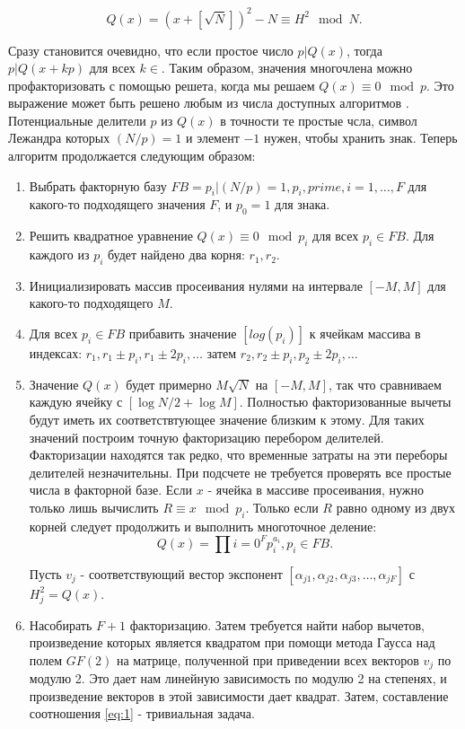 \documentclass[a4paper,12pt]{report}
\begin{document}
\begin{equation}\label{eq:2}
Q(x) = (x + [\sqrt{N}])^2 - N \equiv H^2 \mod N.
\end{equation}

Сразу становится очевидно, что если простое число $p | Q(x)$, тогда $p | Q(x + kp)$ для всех $k \in $. Таким образом, значения многочлена можно профакторизовать с помощью решета, когда мы решаем $Q(x) \equiv 0 \mod p$. Это выражение может быть решено любым из числа доступных алгоритмов \cite[стр 437]{knuth}. Потенциальные делители $p$ из $Q(x)$ в точности те простые чсла, символ Лежандра которых $(N/p) = 1$ и элемент $-1$ нужен, чтобы хранить знак. 
Теперь алгоритм продолжается следующим образом:

\begin{enumerate}[label=\roman*]
	\item Выбрать факторную базу $FB = {p_i | (N/p) = 1, p_i, prime, i = 1, \ldots, F}$ для какого-то подходящего значения $F$, и $p_0 = 1$ для знака.
	\item Решить квадратное уравнение $Q(x) \equiv 0 \mod p_i$ для всех $p_i \in FB$. Для каждого из $p_i$ будет найдено два корня: $r_1, r_2$.
	\item Инициализировать массив просеивания нулями на интервале $[-M, M]$ для какого-то подходящего $M$.
	\item Для всех $p_i \in FB$ прибавить значение $[log(p_i)]$ к ячейкам массива в индексах: $r_1, r_1 \pm p_i, r_1 \pm 2p_i, \ldots$ затем $r_2, r_2 \pm p_i, p_2 \pm 2p_i, \ldots$
	\item Значение $Q(x)$ будет примерно $M\sqrt{N}$ на $[-M, M]$, так что сравниваем каждую ячейку с  $[\log{N}/2 + \log{M}]$. Полностью факторизованные вычеты будут иметь их соответствтующее значение близким к этому. Для таких значений построим точную факторизацию перебором делителей. Факторизации находятся так редко, что временные затраты на эти переборы делителей незначительны. При подсчете не требуется проверять все простые числа в факторной базе. Если $x$ - ячейка в массиве просеивания, нужно только лишь вычислить $R \equiv x \mod p_i$. Только если $R$ равно одному из двух корней следует продолжить и выполнить многоточное деление:
\begin{equation}\label{eq:3}
Q(x) = \prod{i = 0}^{F}p_i^{a_i}, p_i \in FB.
\end{equation}

Пусть $v_j$ - соответствующий вестор экспонент $[\alpha_{j1}, \alpha_{j2}, \alpha_{j3}, \ldots, \alpha_{jF}]$ с $H_{j}^2 = Q(x)$. 
	\item Насобирать $F+1$ факторизацию. Затем требуется найти набор вычетов, произведение которых является квадратом при помощи метода Гаусса над полем $GF(2)$ на матрице, полученной при приведении всех векторов $v_j$ по модулю 2. Это дает нам линейную зависимость по модулю 2 на степенях, и произведение векторов в этой зависимости дает квадрат. Затем, составление соотношения \eqref{eq:1} - тривиальная задача.

\end{enumerate}
\end{document}
